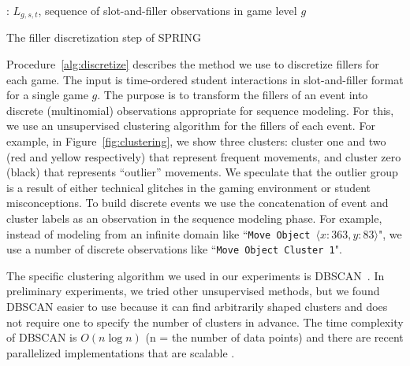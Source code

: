 \documentclass{sigchi}
\def\algname{SPRING\xspace}
\begin{document}
	
	\begin{algorithm}[ht]
		\begin{algorithmic}[1]
			\Require: $L_{g,s,t}$, sequence of slot-and-filler observations in game level $g$
			\EndFor

			\State
				\EndIf
			\EndFor
			\EndFor
			\State {}
			\EndProcedure
			
		\end{algorithmic}
		\caption{The filler discretization step of \algname \label{alg:discretize}}
	\end{algorithm}
	

	
	
	Procedure~\ref{alg:discretize} describes the method we use to discretize fillers for each game.
	The input is time-ordered student interactions in slot-and-filler format for a single game $g$.
	The purpose is to transform the fillers of an event into  discrete (multinomial) observations appropriate for sequence modeling.
	For this, we use an unsupervised clustering algorithm for the fillers of each event.
	For example, in Figure~\ref{fig:clustering}, we show three clusters: cluster one and two (red and yellow respectively) that represent frequent movements, and cluster zero (black) that represents ``outlier'' movements.
	We speculate that the outlier group is a result of either technical glitches in the gaming environment or student misconceptions.
	To build discrete events we use the concatenation of event and cluster labels as an observation in the sequence modeling phase.
	For example, instead of modeling from an infinite  domain like ``\texttt{Move Object $\langle x:363, y:83 \rangle$}",
	we use a number of discrete observations like ``\texttt{Move Object Cluster 1}".
	
		
	
	The specific clustering algorithm we used in our experiments is DBSCAN~\cite{ester1996density}.
	In  preliminary experiments, we tried other unsupervised methods, but  we found DBSCAN easier to use because it can find arbitrarily shaped clusters and does not require one to specify the number of clusters in advance.
	The time complexity of DBSCAN is $O(n \log n)$ (n = the number of data points) and there are recent parallelized implementations that are scalable \cite{dai2012efficient, patwary2012new}.
	
\end{document}
